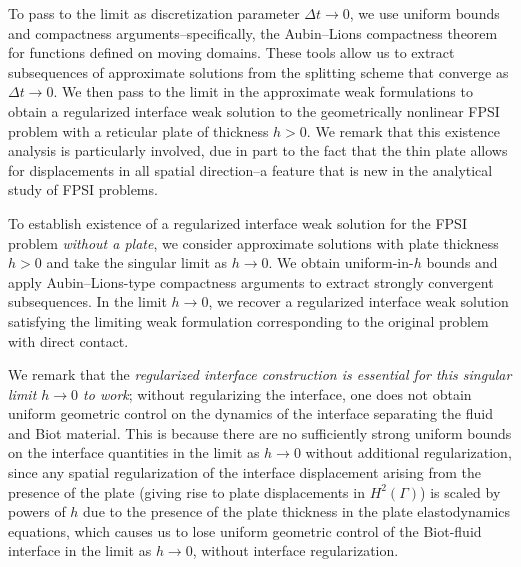 \documentclass[11pt]{article}
\theoremstyle{definition}
\begin{document}
To pass to the limit as discretization parameter $\Delta t \to 0$, we use uniform bounds and compactness arguments--specifically, the Aubin--Lions compactness theorem for functions defined on moving domains. These tools allow us to extract subsequences of approximate solutions from the splitting scheme that converge as $\Delta t \to 0$. We then pass to the limit in the approximate weak formulations to obtain a regularized interface weak solution to the geometrically nonlinear FPSI problem with a reticular plate of thickness $h > 0$.
We remark that this existence analysis is particularly involved, due in part to the fact that the thin plate allows for displacements in all spatial direction--a feature that is new in the analytical study of FPSI problems. 

To establish existence of a regularized interface weak solution for the FPSI problem \textit{without a plate}, we consider approximate solutions with plate thickness $h > 0$ and take the singular limit as $h \to 0$. We obtain uniform-in-$h$ bounds and apply Aubin--Lions-type compactness arguments to extract strongly convergent subsequences. In the limit $h \to 0$, we recover a regularized interface weak solution satisfying the limiting weak formulation corresponding to the original problem with direct contact.

We remark that the {\emph{regularized interface construction is essential for this singular limit $h \to 0$ to work}}; without regularizing the interface, one does not obtain uniform geometric control on the dynamics of the interface separating the fluid and Biot material. This is because there are no sufficiently strong uniform bounds on the interface quantities in the limit as $h \to 0$ without additional regularization, since any spatial regularization of the interface displacement arising from the presence of the plate (giving rise to plate displacements in $H^{2}(\Gamma)$) is scaled by powers of $h$ due to the presence of the plate thickness in the plate elastodynamics equations, which causes us to lose uniform geometric control of the Biot-fluid interface in the limit as $h \to 0$, without interface regularization.
\end{document}

